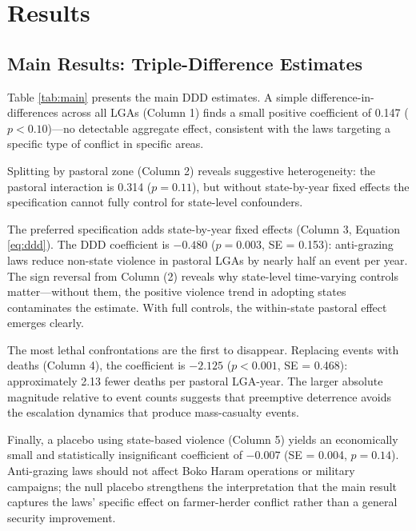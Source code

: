 \documentclass[12pt]{article}
\begin{document}
\section{Results}

\subsection{Main Results: Triple-Difference Estimates}

Table \ref{tab:main} presents the main DDD estimates. A simple difference-in-differences across all LGAs (Column 1) finds a small positive coefficient of 0.147 ($p < 0.10$)---no detectable aggregate effect, consistent with the laws targeting a specific type of conflict in specific areas.

Splitting by pastoral zone (Column 2) reveals suggestive heterogeneity: the pastoral interaction is 0.314 ($p = 0.11$), but without state-by-year fixed effects the specification cannot fully control for state-level confounders.

The preferred specification adds state-by-year fixed effects (Column 3, Equation \ref{eq:ddd}). The DDD coefficient is $-0.480$ ($p = 0.003$, SE = 0.153): anti-grazing laws reduce non-state violence in pastoral LGAs by nearly half an event per year. The sign reversal from Column (2) reveals why state-level time-varying controls matter---without them, the positive violence trend in adopting states contaminates the estimate. With full controls, the within-state pastoral effect emerges clearly.

The most lethal confrontations are the first to disappear. Replacing events with deaths (Column 4), the coefficient is $-2.125$ ($p < 0.001$, SE = 0.468): approximately 2.13 fewer deaths per pastoral LGA-year. The larger absolute magnitude relative to event counts suggests that preemptive deterrence avoids the escalation dynamics that produce mass-casualty events.

Finally, a placebo using state-based violence (Column 5) yields an economically small and statistically insignificant coefficient of $-0.007$ (SE = 0.004, $p = 0.14$). Anti-grazing laws should not affect Boko Haram operations or military campaigns; the null placebo strengthens the interpretation that the main result captures the laws' specific effect on farmer-herder conflict rather than a general security improvement.
\end{document}
